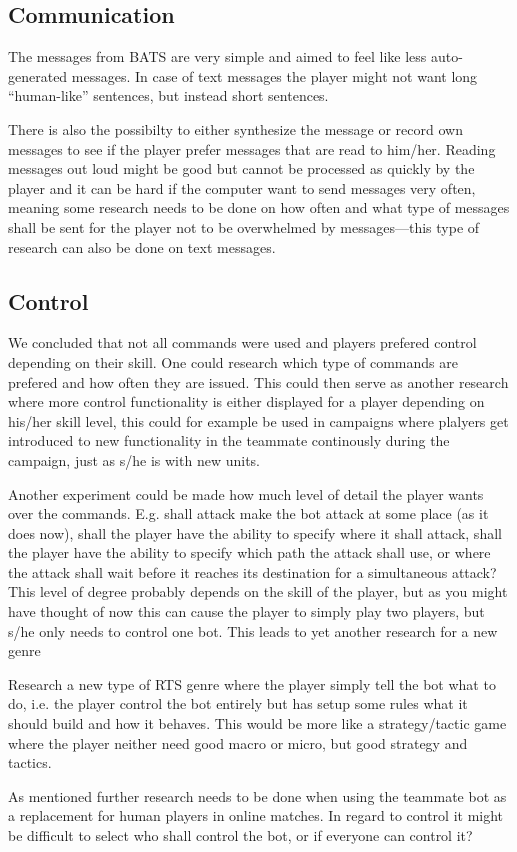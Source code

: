\subsection{Communication}
The messages from BATS are very simple and aimed to feel like less auto-generated messages. In case of text messages the player might not want long ``human-like'' sentences, but instead short sentences.

There is also the possibilty to either synthesize the message or record own messages to see if the player prefer messages that are read to him/her. Reading messages out loud might be good but cannot be processed as quickly by the player and it can be hard if the computer want to send messages very often, meaning some research needs to be done on how often  and what type of messages shall be sent for the player not to be overwhelmed by messages—this type of research can also be done on text messages.

\subsection{Control}
We concluded that not all commands were used and players prefered control depending on their skill. One could research which type of commands are prefered and how often they are issued. This could then serve as another research where more control functionality is either displayed for a player depending on his/her skill level, this could for example be used in campaigns where plalyers get introduced to new functionality in the teammate continously during the campaign, just as s/he is with new units.

Another experiment could be made how much level of detail the player wants over the commands. E.g. shall attack make the bot attack at some place (as it does now), shall the player have the ability to specify where it shall attack, shall the player have the ability to specify which path the attack shall use, or where the attack shall wait before it reaches its destination for a simultaneous attack? This level of degree probably depends on the skill of the player, but as you might have thought of now this can cause the player to simply play two players, but s/he only needs to control one bot. This leads to yet another research for a new genre

Research a new type of RTS genre where the player simply tell the bot what to do, i.e. the player control the bot entirely but has setup some rules what it should build and how it behaves. This would be more like a strategy/tactic game where the player neither need good macro or micro, but good strategy and tactics.

As mentioned further research needs to be done when using the teammate bot as a replacement for human players in online matches. In regard to control it might be difficult to select who shall control the bot, or if everyone can control it?
